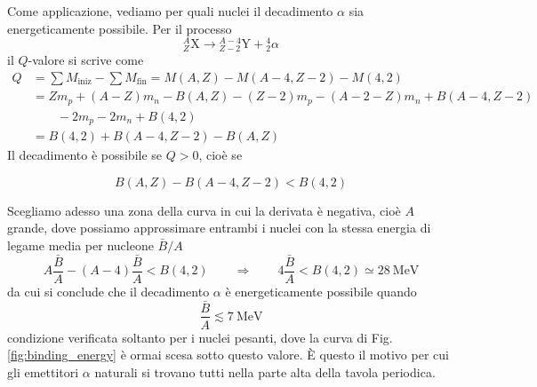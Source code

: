 Come applicazione, vediamo per quali nuclei il decadimento $\alpha$ sia energeticamente possibile. Per il processo
%
\begin{equation*}
    {}^{A}_{Z}\mathrm{X} \longrightarrow {}^{A-4}_{Z-2}\mathrm{Y} + {}^{4}_{2}\alpha
\end{equation*}
il $Q$-valore si scrive come
%
\begin{equation}
\begin{aligned}
    Q & = \sum M_{\text{iniz}} - \sum M_{\text{fin}} = M(A,Z) - M(A-4,Z-2) - M(4,2) \\[4pt]
      & = Z m_p + (A-Z) m_n - B(A,Z) - (Z-2) m_p - (A-2-Z) m_n + B(A-4,Z-2) \\
      & \qquad - 2 m_p - 2 m_n + B(4,2) \\[4pt]
      & = B(4,2) + B(A-4, Z-2) - B(A,Z)
\end{aligned}
\end{equation}
Il decadimento è possibile se $Q > 0$, cioè se
%
\begin{tcolorbox}[colback=black!5!white, colframe=black!45!white, boxrule=0.8pt]
\begin{equation}
    B(A,Z) - B(A-4,Z-2) < B(4,2)
\end{equation}
\end{tcolorbox}
Scegliamo adesso una zona della curva in cui la derivata è negativa, cioè $A$ grande, dove possiamo approssimare entrambi i nuclei con la stessa energia di legame media per nucleone $\bar{B}/A$
%
\begin{equation}
    A \frac{\bar{B}}{A} - (A-4) \frac{\bar{B}}{A} < B(4,2) \qquad \Longrightarrow \qquad 4 \frac{\bar{B}}{A} < B(4,2) \simeq 28 \ \mathrm{MeV}
\end{equation}
da cui si conclude che il decadimento $\alpha$ è energeticamente possibile quando
%
\begin{equation}
    \frac{\bar{B}}{A} \lesssim 7 \ \mathrm{MeV}
\end{equation}
condizione verificata soltanto per i nuclei pesanti, dove la curva di Fig. \ref{fig:binding_energy} è ormai scesa sotto questo valore. È questo il motivo per cui gli emettitori $\alpha$ naturali si trovano tutti nella parte alta della tavola periodica.